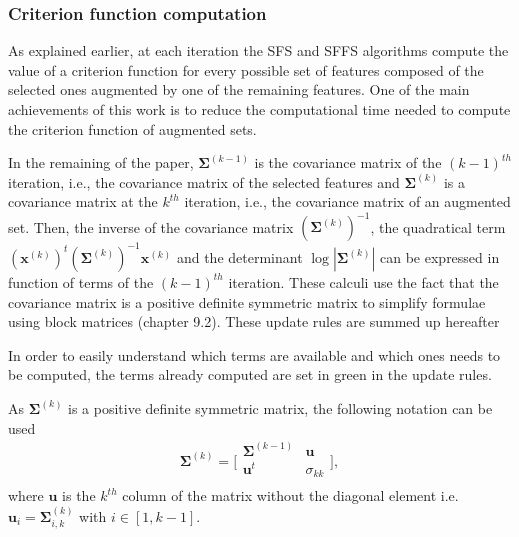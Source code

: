 \documentclass[journal,peerreview,onecolumn]{IEEEtran}
\begin{document}
        \subsubsection{Criterion function computation}
        \label{sec:update-crit}

        As explained earlier, at each iteration the SFS and SFFS algorithms compute the value of a criterion function for every possible set of features composed of the selected ones augmented by one of the remaining features. One of the main achievements of this work is to reduce the computational time needed to compute the criterion function of augmented sets.

        In the remaining of the paper, $\boldsymbol{\Sigma}^{(k-1)}$ is the covariance matrix of the $(k-1)^{th}$ iteration, i.e., the covariance matrix of the selected features and $\boldsymbol{\Sigma}^{(k)}$ is a covariance matrix at the $k^{th}$ iteration, i.e., the covariance matrix of an augmented set. Then, the inverse of the covariance matrix $(\boldsymbol{\Sigma}^{(k)})^{-1}$, the quadratical term $(\mathbf{x}^{(k)})^t (\boldsymbol{\Sigma}^{(k)})^{-1} \mathbf{x}^{(k)}$ and the determinant $\log |\boldsymbol{\Sigma}^{(k)}|$ can be expressed in function of terms of the $(k-1)^{th}$ iteration. These calculi use the fact that the covariance matrix is a positive definite symmetric matrix to simplify formulae using block matrices \cite{webb2003statistical} (chapter 9.2). These update rules are summed up hereafter

        In order to easily understand which terms are available and which ones needs to be computed, the terms already computed are set in green in the update rules.

        As $\boldsymbol{\Sigma}^{(k)}$ is a positive definite symmetric matrix, the following notation can be used
        \begin{equation*}
            \boldsymbol{\Sigma}^{(k)} =
            \bigg[\begin{array}{cc}
            \boldsymbol{\Sigma}^{(k-1)} & \mathbf{u}      \\
            \mathbf{u}^t          & \sigma_{kk} \\
            \end{array}\bigg],
        \end{equation*}
        where $\mathbf{u}$ is the $k^{th}$ column of the matrix without the diagonal element i.e. $\mathbf{u}_{i} = \boldsymbol{\Sigma}^{(k)}_{i,k}$ with $i \in [1,k-1]$.
\end{document}
